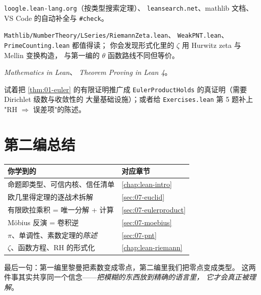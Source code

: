 \begin{description}[leftmargin=2.2em]
  \item[查库] \texttt{loogle.lean-lang.org}（按类型搜索定理）、
        \texttt{leansearch.net}、mathlib 文档\cite{mathlib4}、
        VS Code 的自动补全与 \texttt{\#check}。
  \item[读库] \texttt{Mathlib/NumberTheory/LSeries/RiemannZeta.lean}、
        \texttt{WeakPNT.lean}、\texttt{PrimeCounting.lean} 都值得读；
        你会发现形式化里的 $\zeta$ 用 Hurwitz zeta 与 Mellin 变换构造，
        与第一编的 $\theta$ 函数路线不同但等价。
  \item[教材] \emph{Mathematics in Lean}\cite{mil2023}、
        \emph{Theorem Proving in Lean 4}\cite{lean4ref}。
  \item[进阶] 试着把 \cref{thm:01-euler} 的有限证明推广成
        \texttt{EulerProductHolds} 的真证明（需要 Dirichlet 级数与收敛性的
        大量基础设施）；或者给 \texttt{Exercises.lean} 第 5 题补上
        "RH $\Rightarrow$ 误差项"的陈述。
\end{description}

\section{第二编总结}
\label{sec:08-summary}

\begin{center}\small
\begin{tabular}{@{}p{}p{}@{}}
\toprule
\textbf{你学到的} & \textbf{对应章节}\\
\midrule
命题即类型、可信内核、信任清单 & \cref{chap:lean-intro}\\
欧几里得定理的逐战术拆解 & \cref{sec:07-euclid}\\
有限欧拉乘积 = 唯一分解 + 计算 & \cref{sec:07-eulerproduct}\\
M\"obius 反演 = 卷积逆 & \cref{sec:07-moebius}\\
$\pi$、单调性、素数定理的\emph{陈述} & \cref{sec:07-pnt}\\
$\zeta$、函数方程、RH 的形式化 & \cref{chap:lean-riemann}\\
\bottomrule
\end{tabular}
\end{center}

最后一句：第一编里黎曼把素数变成零点，第二编里我们把零点变成类型。
这两件事其实共享同一个信念——\emph{把模糊的东西放到精确的语言里，
它才会真正被理解}。
